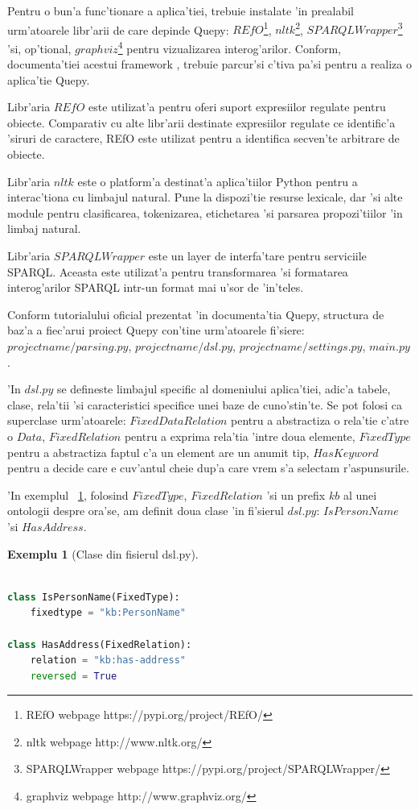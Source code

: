 \documentclass[12pt,a4paper,twoside]{report}
\newtheorem{example}{Exemplu}
\begin{document}
Pentru o bun'a func'tionare a aplica'tiei, trebuie instalate 'in prealabil urm'atoarele libr'arii de care depinde Quepy:  $REfO$\footnote{REfO webpage https://pypi.org/project/REfO/}, $nltk$\footnote{nltk webpage http://www.nltk.org/}, $SPARQLWrapper$\footnote{SPARQLWrapper webpage https://pypi.org/project/SPARQLWrapper/} 'si, op'tional, $graphviz$\footnote{graphviz webpage http://www.graphviz.org/} pentru vizualizarea interog'arilor.
Conform, documenta'tiei acestui framework \cite{quepyCite}, trebuie parcur'si c\ia 'tiva pa'si pentru a realiza o aplica'tie Quepy. 

Libr'aria $REfO$ este utilizat'a pentru oferi suport expresiilor regulate pentru obiecte. Comparativ cu alte libr'arii destinate expresiilor regulate ce identific'a 'siruri de caractere, REfO este utilizat pentru a identifica secven'te arbitrare de obiecte. 

Libr'aria $nltk$ este o platform'a destinat'a aplica'tiilor Python pentru a interac'tiona cu limbajul natural. Pune la dispozi'tie resurse lexicale, dar 'si alte module pentru clasificarea, tokenizarea, etichetarea 'si parsarea propozi'tiilor 'in limbaj natural.

Libr'aria $SPARQLWrapper$ este un layer de interfa'tare pentru serviciile SPARQL. Aceasta este utilizat'a pentru transformarea 'si formatarea interog'arilor SPARQL intr-un format mai u'sor de 'in'teles.

Conform tutorialului oficial prezentat 'in documenta'tia Quepy, structura de baz'a a fiec'arui proiect Quepy con'tine urm'atoarele fi'siere: $projectname/parsing.py$, $projectname/dsl.py$, $projectname/settings.py$, $main.py$. 


'In $dsl.py$ se defineste limbajul specific al domeniului aplica'tiei, adic'a tabele, clase, rela'tii 'si caracteristici specifice unei baze de cuno'stin'te. Se pot folosi ca superclase urm'atoarele: $FixedDataRelation$ pentru a abstractiza o rela'tie c'atre o $Data$, $FixedRelation$ pentru a exprima rela'tia 'intre doua elemente, $FixedType$ pentru a abstractiza faptul c'a un element are un anumit tip, $HasKeyword$ pentru a decide care e cuv'antul cheie dup'a care vrem s'a selectam r'aspunsurile. 

'In exemplul ~\ref{ex:dsl}, folosind $FixedType$, $FixedRelation$ 'si un prefix $kb$ al unei ontologii despre ora'se, am definit doua clase 'in fi'sierul $dsl.py$: $IsPersonName$ 'si $HasAddress$.
\begin{example}[Clase din fisierul dsl.py]
\begin{lstlisting}[basicstyle=\footnotesize, language = Python]

class IsPersonName(FixedType):
    fixedtype = "kb:PersonName"
    
class HasAddress(FixedRelation):
    relation = "kb:has-address"
    reversed = True
\end{lstlisting}
\label{ex:dsl}
\end{example}
\end{document}

